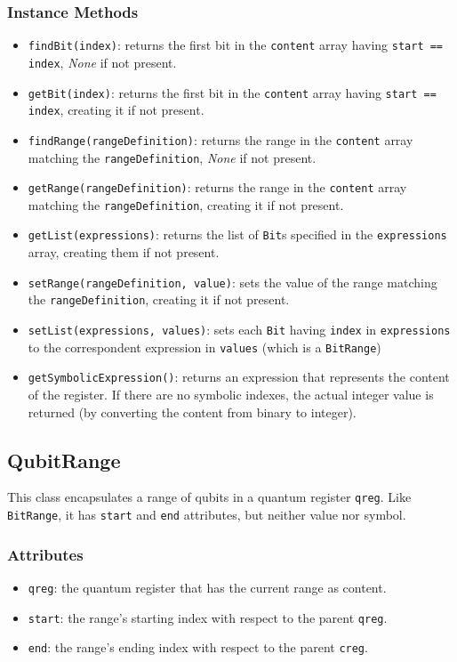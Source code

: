 \documentclass[12pt,a4paper]{report}
\theoremstyle{definition}
\theoremstyle{definition}
\theoremstyle{definition}
\begin{document}
\subsubsection{Instance Methods}
\begin{itemize}
    \itemsep 0em
    \item \texttt{findBit(index)}: returns the first bit in the \texttt{content} array having \texttt{start == index}, \textit{None} if not present.
    \item \texttt{getBit(index)}: returns the first bit in the \texttt{content} array having \texttt{start == index}, creating it if not present.
    \item \texttt{findRange(rangeDefinition)}: returns the range in the \texttt{content} array matching the \texttt{rangeDefinition}, \textit{None} if not present.
    \item \texttt{getRange(rangeDefinition)}: returns the range in the \texttt{content} array matching the \texttt{rangeDefinition}, creating it if not present.
    \item \texttt{getList(expressions)}: returns the list of \texttt{Bit}s specified in the \texttt{expressions} array, creating them if not present.
    \item \texttt{setRange(rangeDefinition, value)}: sets the value of the range matching the \texttt{rangeDefinition}, creating it if not present.
    \item \texttt{setList(expressions, values)}: sets each \texttt{Bit} having \texttt{index} in \texttt{expressions} to the correspondent expression in \texttt{values} (which is a \texttt{BitRange})
    \item \texttt{getSymbolicExpression()}: returns an expression that represents the content of the register. If there are no symbolic indexes, the actual integer value is returned (by converting the content from binary to integer).
\end{itemize}






\subsection{QubitRange}
This class encapsulates a range of qubits in a quantum register \texttt{qreg}. Like \texttt{BitRange}, it has \texttt{start} and \texttt{end} attributes, but neither value nor symbol.
\subsubsection{Attributes}
\begin{itemize}
    \itemsep 0em
    \item \texttt{qreg}: the quantum register that has the current range as content.
    \item \texttt{start}: the range's starting index with respect to the parent \texttt{qreg}.
    \item \texttt{end}: the range's ending index with respect to the parent \texttt{creg}.
\end{itemize}
\end{document}
